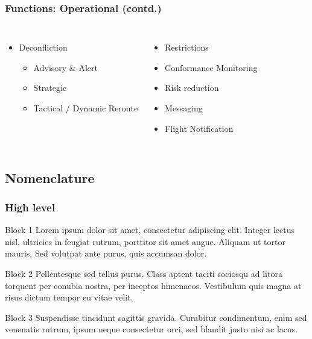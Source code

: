 \documentclass[usenames,dvipsnames,aspectratio=169,serif]{beamer}
\begin{document}
\begin{frame}
   \frametitle{Functions: Operational (contd.)}
   \begin{columns}[t] %

      \begin{itemize}
         \item Deconfliction
            \begin{itemize}
               \item Advisory \& Alert
               \item Strategic
               \item Tactical / Dynamic Reroute
            \end{itemize}
      \end{itemize}

      \begin{itemize}
         \item Restrictions
         \item Conformance Monitoring
         \item Risk reduction
         \item Messaging
         \item Flight Notification
      \end{itemize}
   \end{columns}

\end{frame}

\subsection{Nomenclature}

\begin{frame}
   \frametitle{High level}
   \begin{block}{Block 1}
      Lorem ipsum dolor sit amet, consectetur adipiscing elit. Integer lectus nisl, ultricies in feugiat rutrum, porttitor sit amet augue. Aliquam ut tortor mauris. Sed volutpat ante purus, quis accumsan dolor.
   \end{block}

   \begin{block}{Block 2}
      Pellentesque sed tellus purus. Class aptent taciti sociosqu ad litora torquent per conubia nostra, per inceptos himenaeos. Vestibulum quis magna at risus dictum tempor eu vitae velit.
   \end{block}

   \begin{block}{Block 3}
      Suspendisse tincidunt sagittis gravida. Curabitur condimentum, enim sed venenatis rutrum, ipsum neque consectetur orci, sed blandit justo nisi ac lacus.
   \end{block}
\end{frame}
\end{document}
